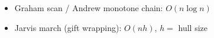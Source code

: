 \begin{itemize}
  \item Graham scan / Andrew monotone chain: $O(n \log n)$
  \item Jarvis march (gift wrapping): $O(nh)$, $h =$ hull size
\end{itemize}
